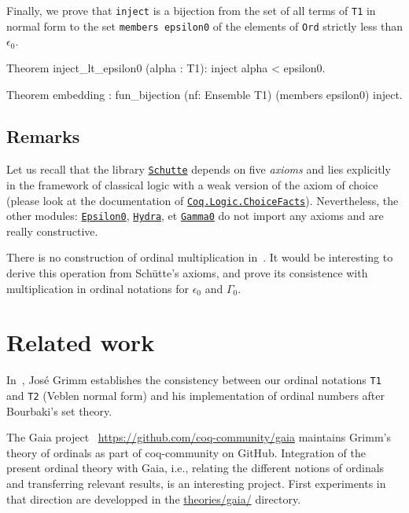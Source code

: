 {Finally, we prove that \texttt{inject} is a bijection from the set of all terms of \texttt{T1} in normal form to the set 
\texttt{members epsilon0} of the elements of \texttt{Ord} strictly less than  $\epsilon_0$.

\begin{Coqsrc}
Theorem inject_lt_epsilon0 (alpha : T1):
      inject alpha < epsilon0.

Theorem embedding : 
     fun_bijection (nf: Ensemble T1)  (members epsilon0) inject.
 \end{Coqsrc}

\subsection{Remarks}
Let us recall that the library \href{../theories/html/hydras.Schutte.Schutte.html}%
{\texttt{Schutte}} depends on five \emph{axioms} and lies explicitly in the  
framework of classical logic with a weak version of the axiom of choice
(please look at the documentation of
\href{https://coq.inria.fr/distrib/current/stdlib/Coq.Logic.ChoiceFacts.html}{\texttt{Coq.Logic.ChoiceFacts}}).
Nevertheless, the other modules:
\href{../theories/html/hydras.Epsilon0.Epsilon0.html}%
{\texttt{Epsilon0}},
\href{../theories/html/hydras.Hydra.Hydra.html}%
{\texttt{Hydra}}, et 
\href{../theories/html/hydras.Gamma0.Gamma0.html}%
{\texttt{Gamma0}}
do not import any axioms and are really constructive.

\begin{project}
There is no construction of ordinal multiplication in~\cite{schutte}. 
It would be interesting to derive this operation from Schütte's axioms,
and prove its consistence with multiplication in ordinal notations for 
$\epsilon_0$ and $\Gamma_0$.
\end{project}

\section{Related work}

In~\cite{grimm:hal-00911710}, José Grimm establishes the consistency between our ordinal notations \texttt{T1} and \texttt{T2} (Veblen normal form) and his implementation
of ordinal numbers after Bourbaki's set theory.

The Gaia project ~\url{https://github.com/coq-community/gaia} maintains Grimm's  theory of ordinals as part of coq-community on GitHub. Integration
of the present ordinal theory with Gaia, i.e., relating the different notions of ordinals
and transferring relevant results, is an interesting project.
First experiments in that direction are developped in
the \href{https://github.com/coq-community/hydra-battles/blob/master/theories/gaia/}{theories/gaia/} directory.




}
